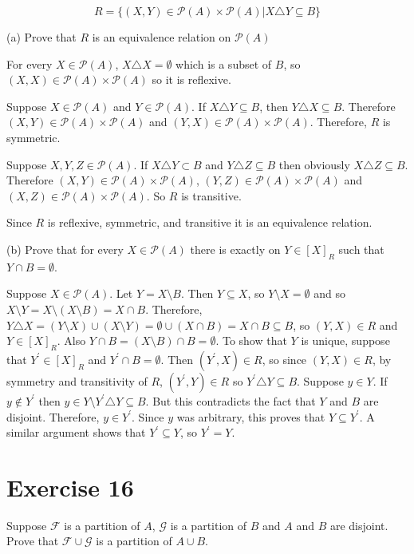 \documentclass[11pt]{article}
\newcommand{\powerset}[1]{\mathscr{P}(#1)}
\newcommand{\family}[1]{\mathcal{#1}}
\begin{document}
$$R = \{(X,Y) \in \powerset{A} \times \powerset{A} | X \triangle Y \subseteq B\}$$

\noindent (a) Prove that $R$ is an equivalence relation on $\powerset{A}$

For every $X \in \powerset{A}$, $X \triangle X = \emptyset$ which is a subset 
of $B$, so $(X,X) \in \powerset{A} \times \powerset{A}$ so it is reflexive.

Suppose $X \in \powerset{A}$ and $Y \in \powerset{A}$. If 
$X \triangle Y \subseteq B$, then $Y \triangle X \subseteq B$. Therefore 
$(X, Y) \in \powerset{A} \times \powerset{A}$ and 
$(Y, X) \in \powerset{A} \times \powerset{A}$. Therefore, $R$ is symmetric.

Suppose $X, Y, Z \in \powerset{A}$. If $X \triangle Y \subset B$ and 
$Y \triangle Z \subseteq B$ then obviously $X \triangle Z \subseteq B$. 
Therefore $(X, Y) \in \powerset{A} \times \powerset{A}$,
$(Y, Z) \in \powerset{A} \times \powerset{A}$ and $(X, Z) \in \powerset{A} \times \powerset{A}$.
So $R$ is transitive.

Since $R$ is reflexive, symmetric, and transitive it is an equivalence relation.

\noindent (b) Prove that for every $X \in \powerset{A}$ there is exactly on 
$Y \in [X]_R$ such that $Y \cap B = \emptyset$.

Suppose $X \in \powerset{A}$. Let $Y = X \setminus B$. Then $Y \subseteq X$,
so $Y \setminus X = \emptyset$ and so 
$X \setminus Y = X \setminus (X \setminus B) = X \cap B$.
Therefore, 
$Y \triangle X = (Y \setminus X) \cup (X \setminus Y) = \emptyset \cup (X \cap B) = X \cap B \subseteq B$,
so $(Y, X)  \in R$ and $Y \in [X]_R$. Also $Y \cap B = (X \setminus B) \cap B = \emptyset$.
To show that $Y$ is unique, suppose that $Y^\prime \in [X]_R$ and 
$Y^\prime \cap B = \emptyset$. Then $(Y^\prime, X) \in R$, so since $(Y, X) \in R$,
by symmetry and transitivity of $R$, $(Y^\prime, Y) \in R$ so 
$Y^\prime \triangle Y \subseteq B$. Suppose $y \in Y$. If $y \notin Y^\prime$
then $y \in Y \setminus Y^\prime \triangle Y \subseteq B$. But this 
contradicts the fact that $Y$ and $B$ are disjoint. Therefore, $y \in Y^\prime$.
Since $y$ was arbitrary, this proves that $Y \subseteq Y^\prime$. A similar 
argument shows that $Y^\prime \subseteq Y$, so $Y^\prime = Y$.

\section*{Exercise 16} Suppose $\family{F}$ is a partition of $A$, $\family{G}$
is a partition of $B$ and $A$ and $B$ are disjoint. Prove that 
$\family{F} \cup \family{G}$ is a partition of $A \cup B$.
\end{document}
